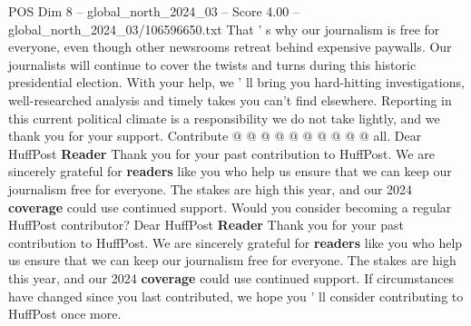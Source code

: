 \begin{textsample}{POS Dim 8 – global\_north\_2024\_03 – Score 4.00 – global\_north\_2024\_03/106596650.txt}
That ' s why our journalism is free for everyone, even though other newsrooms retreat behind expensive paywalls.
Our journalists will continue to cover the twists and turns during this historic presidential election.
With your help, we ' ll bring you hard-hitting investigations, well-researched analysis and timely takes you can't find elsewhere.
Reporting in this current political climate is a responsibility we do not take lightly, and we thank you for your support.
Contribute @ @ @ @ @ @ @ @ @ @ all.
Dear HuffPost \textbf{Reader} Thank you for your past contribution to HuffPost.
We are sincerely grateful for \textbf{readers} like you who help us ensure that we can keep our journalism free for everyone.
The stakes are high this year, and our 2024 \textbf{coverage} could use continued support.
Would you consider becoming a regular HuffPost contributor?
Dear HuffPost \textbf{Reader} Thank you for your past contribution to HuffPost.
We are sincerely grateful for \textbf{readers} like you who help us ensure that we can keep our journalism free for everyone.
The stakes are high this year, and our 2024 \textbf{coverage} could use continued support.
If circumstances have changed since you last contributed, we hope you ' ll consider contributing to HuffPost once more.

\end{textsample}
